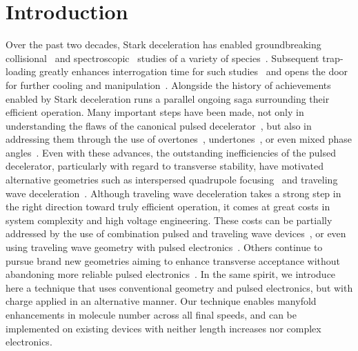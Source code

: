 \documentclass[%
 reprint,
 amsmath,amssymb,
 aps,
pra,
]{revtex4-1}
\begin{document}
\section{Introduction}
Over the past two decades, Stark deceleration has enabled groundbreaking collisional~\cite{Sawyer2011,Kirste2012,Gao2018} and spectroscopic~\cite{Veldhoven2004,Hudson2006,Lev2006,Fast2018} studies of a variety of species~\cite{VanDeMeerakker2012}. Subsequent trap-loading greatly enhances interrogation time for such studies~\cite{Sawyer2008} and opens the door for further cooling and manipulation~\cite{Stuhl2012evap, Reens2017}. Alongside the history of achievements enabled by Stark deceleration runs a parallel ongoing saga surrounding their efficient operation. Many important steps have been made, not only in understanding the flaws of the canonical pulsed decelerator~\cite{VanDeMeerakker2006,Sawyer2008a}, but also in addressing them through the use of overtones~\cite{VanDeMeerakker2005a,Scharfenberg2009}, undertones~\cite{Zhang2016}, or even mixed phase angles~\cite{Parazzoli2009,Hou2013}. Even with these advances, the outstanding inefficiencies of the pulsed decelerator, particularly with regard to transverse stability, have motivated alternative geometries such as interspersed quadrupole focusing~\cite{Sawyer2008a} and traveling wave deceleration~\cite{Osterwalder2010,VandenBerg2014,Fabrikant2014}. Although traveling wave deceleration takes a strong step in the right direction toward truly efficient operation, it comes at great costs in system complexity and high voltage engineering. These costs can be partially addressed by the use of combination pulsed and traveling wave devices~\cite{Quintero-Perez2013}, or even using traveling wave geometry with pulsed electronics~\cite{Shyur2017}. Others continue to pursue brand new geometries aiming to enhance transverse acceptance without abandoning more reliable pulsed electronics~\cite{Wang2016}. In the same spirit, we introduce here a technique that uses conventional geometry and pulsed electronics, but with charge applied in an alternative manner. Our technique enables manyfold enhancements in molecule number across all final speeds, and can be implemented on existing devices with neither length increases nor complex electronics.
\end{document}
